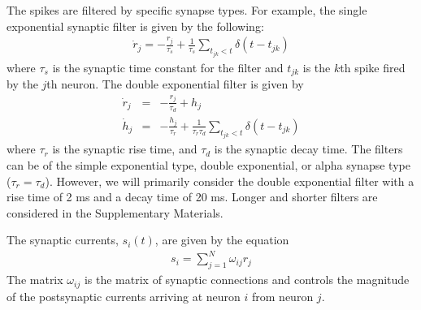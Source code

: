 \documentclass[11pt]{article} %
\begin{document}
The spikes are filtered by specific synapse types.  
For example, the single exponential synaptic filter is given by the following:
\begin{eqnarray}
\dot{r}_j = -\frac{r_j}{\tau_s} + \frac{1}{\tau_s}\sum_{t_{jk}<t}\delta(t-t_{jk})  \label{fr11}
\end{eqnarray}
where $\tau_s$ is the synaptic time constant for the filter and $t_{jk}$ 
is the $k$th spike fired by the $j$th neuron.  
The double exponential filter is given by 
\begin{eqnarray}
\dot{r}_j &=& -\frac{r_j}{\tau_d} + h_j \\
\dot{h}_j&=& -\frac{h_j}{\tau_r} + \frac{1}{\tau_r\tau_d} \sum_{t_{jk}<t}\delta(t-t_{jk})  \label{fr12}
\end{eqnarray}
where $\tau_r$ is the synaptic rise time, and $\tau_d$ is the synaptic decay time.    
The filters can be of the simple exponential type, double exponential, 
or alpha synapse type ($\tau_r = \tau_d$).   
However, we will primarily consider the double exponential filter with a rise time of 
2 ms and a decay time of 20 ms.  
Longer and shorter filters are considered in the Supplementary Materials.   

The synaptic currents, $s_i(t)$, are given by the equation 
\begin{eqnarray}
s_i = \sum_{j=1}^N  \omega_{ij}r_j 
\end{eqnarray} 
The matrix $\omega_{ij}$ is the matrix of synaptic connections and controls 
the magnitude of the postsynaptic currents arriving at neuron $i$ from neuron $j$.  
\end{document}
